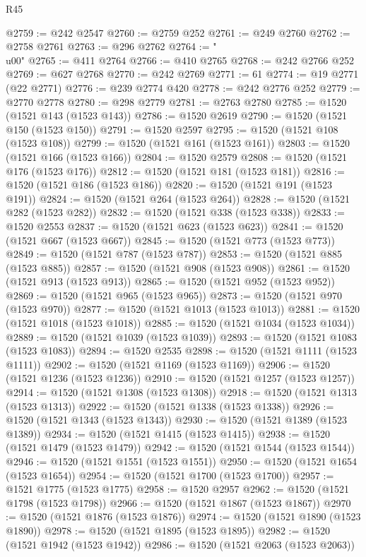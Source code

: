 \begin{lexlean}{R45}
\begin{coremodule}
{@2759 := @242 @2547
@2760 := @2759 @252
@2761 := @249 @2760
@2762 := @2758 @2761
@2763 := @296 @2762
@2764 := "\\u00"
@2765 := @411 @2764
@2766 := @410 @2765
@2768 := @242 @2766 @252
@2769 := @627 @2768
@2770 := @242 @2769
@2771 := 61
@2774 := @19 @2771 (@22 @2771)
@2776 := @239 @2774 @420
@2778 := @242 @2776 @252
@2779 := @2770 @2778
@2780 := @298 @2779
@2781 := @2763 @2780
@2785 := @1520 (@1521 @143 (@1523 @143))
@2786 := @1520 @2619
@2790 := @1520 (@1521 @150 (@1523 @150))
@2791 := @1520 @2597
@2795 := @1520 (@1521 @108 (@1523 @108))
@2799 := @1520 (@1521 @161 (@1523 @161))
@2803 := @1520 (@1521 @166 (@1523 @166))
@2804 := @1520 @2579
@2808 := @1520 (@1521 @176 (@1523 @176))
@2812 := @1520 (@1521 @181 (@1523 @181))
@2816 := @1520 (@1521 @186 (@1523 @186))
@2820 := @1520 (@1521 @191 (@1523 @191))
@2824 := @1520 (@1521 @264 (@1523 @264))
@2828 := @1520 (@1521 @282 (@1523 @282))
@2832 := @1520 (@1521 @338 (@1523 @338))
@2833 := @1520 @2553
@2837 := @1520 (@1521 @623 (@1523 @623))
@2841 := @1520 (@1521 @667 (@1523 @667))
@2845 := @1520 (@1521 @773 (@1523 @773))
@2849 := @1520 (@1521 @787 (@1523 @787))
@2853 := @1520 (@1521 @885 (@1523 @885))
@2857 := @1520 (@1521 @908 (@1523 @908))
@2861 := @1520 (@1521 @913 (@1523 @913))
@2865 := @1520 (@1521 @952 (@1523 @952))
@2869 := @1520 (@1521 @965 (@1523 @965))
@2873 := @1520 (@1521 @970 (@1523 @970))
@2877 := @1520 (@1521 @1013 (@1523 @1013))
@2881 := @1520 (@1521 @1018 (@1523 @1018))
@2885 := @1520 (@1521 @1034 (@1523 @1034))
@2889 := @1520 (@1521 @1039 (@1523 @1039))
@2893 := @1520 (@1521 @1083 (@1523 @1083))
@2894 := @1520 @2535
@2898 := @1520 (@1521 @1111 (@1523 @1111))
@2902 := @1520 (@1521 @1169 (@1523 @1169))
@2906 := @1520 (@1521 @1236 (@1523 @1236))
@2910 := @1520 (@1521 @1257 (@1523 @1257))
@2914 := @1520 (@1521 @1308 (@1523 @1308))
@2918 := @1520 (@1521 @1313 (@1523 @1313))
@2922 := @1520 (@1521 @1338 (@1523 @1338))
@2926 := @1520 (@1521 @1343 (@1523 @1343))
@2930 := @1520 (@1521 @1389 (@1523 @1389))
@2934 := @1520 (@1521 @1415 (@1523 @1415))
@2938 := @1520 (@1521 @1479 (@1523 @1479))
@2942 := @1520 (@1521 @1544 (@1523 @1544))
@2946 := @1520 (@1521 @1551 (@1523 @1551))
@2950 := @1520 (@1521 @1654 (@1523 @1654))
@2954 := @1520 (@1521 @1700 (@1523 @1700))
@2957 := @1521 @1775 (@1523 @1775)
@2958 := @1520 @2957
@2962 := @1520 (@1521 @1798 (@1523 @1798))
@2966 := @1520 (@1521 @1867 (@1523 @1867))
@2970 := @1520 (@1521 @1876 (@1523 @1876))
@2974 := @1520 (@1521 @1890 (@1523 @1890))
@2978 := @1520 (@1521 @1895 (@1523 @1895))
@2982 := @1520 (@1521 @1942 (@1523 @1942))
@2986 := @1520 (@1521 @2063 (@1523 @2063))
}
\end{coremodule}
\end{lexlean}

